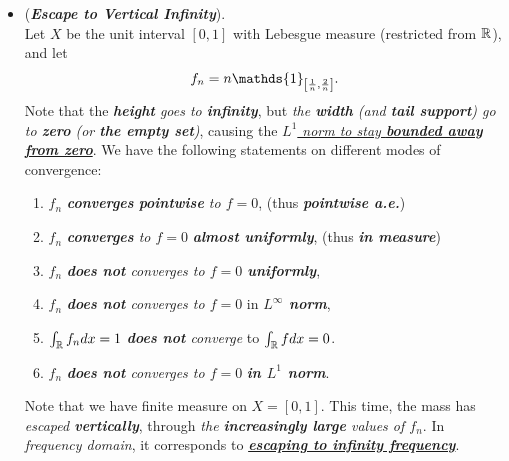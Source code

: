 \documentclass[11pt]{article}
\begin{document}
\begin{itemize}
\item \begin{example} (\emph{\textbf{Escape to Vertical Infinity}}).\\  
Let $X$ be the unit interval $[0, 1]$ with Lebesgue measure (restricted from ${\mathbb R}$), and let 
\begin{align*}
f_n = n\mathds{1}_{\brac{ \frac{1}{n}, \frac{2}{n}}}.
\end{align*} Note that the \emph{\textbf{height} goes to \textbf{infinity}}, but \emph{the \textbf{width} (and \textbf{tail support}) go to \textbf{zero} (or \textbf{the empty set})}, causing the \underline{\emph{$L^1$ norm to stay \textbf{bounded away from zero}}}. We have the following statements on different modes of convergence:
\begin{enumerate}
\item $f_n$ \emph{\textbf{converges} \textbf{pointwise} to $f = 0$}, (thus \textbf{\emph{pointwise a.e.}})
\item  $f_n$ \emph{\textbf{converges} to $f = 0$} \emph{\textbf{almost uniformly}}, (thus \emph{\textbf{in measure}}) 
\item  $f_n$ \emph{\textbf{does not} converges  to $f = 0$ \textbf{uniformly}},
\item  $f_n$ \emph{\textbf{does not} converges to $f = 0$} in \emph{\textbf{$L^{\infty}$ norm}}, 
\item $\int_{{\mathbb R}}f_{n} dx = 1$ \emph{\textbf{does not} converge} to $\int_{{\mathbb R}}f dx = 0$.
\item  $f_n$ \emph{\textbf{does not} converges to $f = 0$} \emph{\textbf{in $L^1$ norm}}. 
\end{enumerate} Note that we have finite measure on $X  = [0, 1]$. This time, the mass has \emph{escaped \textbf{vertically}}, through \emph{the \textbf{increasingly large} values of $f_n$}.  In \emph{frequency domain}, it corresponds to \underline{\emph{\textbf{escaping to infinity frequency}}}. 
\end{example}


\end{itemize}
\end{document}
